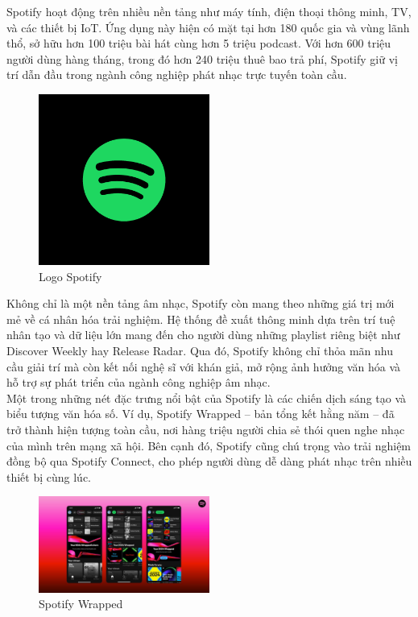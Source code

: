 \documentclass{../hcmut-report}
\begin{document}
Spotify hoạt động trên nhiều nền tảng như máy tính, điện thoại thông minh, TV, và các thiết bị IoT. Ứng dụng này hiện có mặt tại hơn 180 quốc gia và vùng lãnh thổ, sở hữu hơn 100 triệu bài hát cùng hơn 5 triệu podcast. Với hơn 600 triệu người dùng hàng tháng, trong đó hơn 240 triệu thuê bao trả phí, Spotify giữ vị trí dẫn đầu trong ngành công nghiệp phát nhạc trực tuyến toàn cầu.\\

\begin{figure}[h] %
    \centering %
    \includegraphics[width=0.5\textwidth]{../graphics/spotify_logo.png} %
    \caption{Logo Spotify} %
    \label{fig:example} %
\end{figure}

Không chỉ là một nền tảng âm nhạc, Spotify còn mang theo những giá trị mới mẻ về cá nhân hóa trải nghiệm. Hệ thống đề xuất thông minh dựa trên trí tuệ nhân tạo và dữ liệu lớn mang đến cho người dùng những playlist riêng biệt như Discover Weekly hay Release Radar. Qua đó, Spotify không chỉ thỏa mãn nhu cầu giải trí mà còn kết nối nghệ sĩ với khán giả, mở rộng ảnh hưởng văn hóa và hỗ trợ sự phát triển của ngành công nghiệp âm nhạc.\\

Một trong những nét đặc trưng nổi bật của Spotify là các chiến dịch sáng tạo và biểu tượng văn hóa số. Ví dụ, Spotify Wrapped – bản tổng kết hằng năm – đã trở thành hiện tượng toàn cầu, nơi hàng triệu người chia sẻ thói quen nghe nhạc của mình trên mạng xã hội. Bên cạnh đó, Spotify cũng chú trọng vào trải nghiệm đồng bộ qua Spotify Connect, cho phép người dùng dễ dàng phát nhạc trên nhiều thiết bị cùng lúc.\\
\begin{figure}[h] %
    \centering %
    \includegraphics[width=0.5\textwidth]{../graphics/spotify_wrapped.png} %
    \caption{Spotify Wrapped} %
    \label{fig:example} %
\end{figure}
\end{document}

